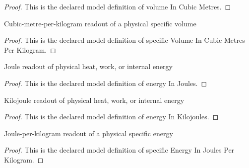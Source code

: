 \begin{proof}
  This is the declared model definition of volume In Cubic Metres.
\end{proof}
\begin{definition}
  \label{def:physics:phyx-mini-0454:phyxminiproblems-problemphyxmini0454-specificvolumeincubicmetresperkilogram}
  Cubic-metre-per-kilogram readout of a physical specific volume
\end{definition}
\begin{proof}
  This is the declared model definition of specific Volume In Cubic Metres Per Kilogram.
\end{proof}
\begin{definition}
  \label{def:physics:phyx-mini-0454:phyxminiproblems-problemphyxmini0454-energyinjoules}
  Joule readout of physical heat, work, or internal energy
\end{definition}
\begin{proof}
  This is the declared model definition of energy In Joules.
\end{proof}
\begin{definition}
  \label{def:physics:phyx-mini-0454:phyxminiproblems-problemphyxmini0454-energyinkilojoules}
  Kilojoule readout of physical heat, work, or internal energy
\end{definition}
\begin{proof}
  This is the declared model definition of energy In Kilojoules.
\end{proof}
\begin{definition}
  \label{def:physics:phyx-mini-0454:phyxminiproblems-problemphyxmini0454-specificenergyinjoulesperkilogram}
  Joule-per-kilogram readout of a physical specific energy
\end{definition}
\begin{proof}
  This is the declared model definition of specific Energy In Joules Per Kilogram.
\end{proof}
